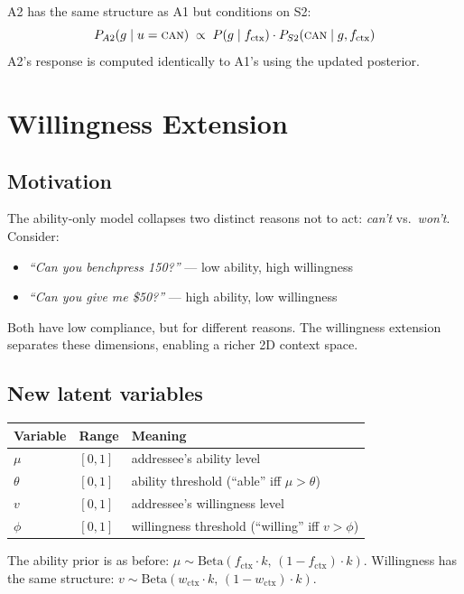 \documentclass[11pt]{article}
\begin{document}
A2 has the same structure as A1 but conditions on S2:
\[
  P_{A2}(g \mid u = \textsc{can}) \;\propto\; P(g \mid f_{\text{ctx}})\cdot P_{S2}(\textsc{can} \mid g, f_{\text{ctx}})
\]
A2's response is computed identically to A1's using the updated posterior.

\section{Willingness Extension}
\label{sec:willingness}

\subsection{Motivation}

The ability-only model collapses two distinct reasons not to act: \emph{can't}
vs.\ \emph{won't}. Consider:
\begin{itemize}
  \item \emph{``Can you benchpress 150?''} --- low ability, high willingness
  \item \emph{``Can you give me \$50?''} --- high ability, low willingness
\end{itemize}
Both have low compliance, but for different reasons. The willingness extension
separates these dimensions, enabling a richer 2D context space.

\subsection{New latent variables}

\begin{center}
\renewcommand{\arraystretch}{1.2}
\begin{tabular}{lll}
\toprule
\textbf{Variable} & \textbf{Range} & \textbf{Meaning} \\
\midrule
$\mu$ & $[0,1]$ & addressee's ability level \\
$\theta$ & $[0,1]$ & ability threshold (``able'' iff $\mu > \theta$) \\
$v$ & $[0,1]$ & addressee's willingness level \\
$\phi$ & $[0,1]$ & willingness threshold (``willing'' iff $v > \phi$) \\
\bottomrule
\end{tabular}
\end{center}

The ability prior is as before: $\mu \sim \mathrm{Beta}(f_{\text{ctx}}\cdot k,\, (1-f_{\text{ctx}})\cdot k)$.
Willingness has the same structure: $v \sim \mathrm{Beta}(w_{\text{ctx}}\cdot k,\, (1-w_{\text{ctx}})\cdot k)$.
\end{document}
